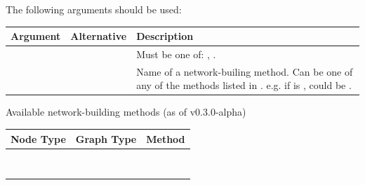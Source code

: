 \documentclass[letterpaper,10pt,english]{sphinxmanual}
\begin{document}
The following arguments should be used:

\begin{tabulary}{\linewidth}{|L|L|L|}
\hline
\textbf{
Argument
} & \textbf{
Alternative
} & \textbf{
Description
}\\\hline

 & 
 & 
Must be one of: , .
\\\hline

 & 
 & 
Name of a network-builing method. Can be
one of any of the methods listed in
{\hyperref[tethne.networks:module-tethne.networks]{}}. e.g. if  is
,  could be
.
\\\hline
\end{tabulary}


Available network-building methods (as of v0.3.0-alpha)

\begin{tabulary}{\linewidth}{|L|L|L|}
\hline
\textbf{
Node Type
} & \textbf{
Graph Type
} & \textbf{
Method
}\\\hline

 & 
 & 
{\hyperref[tethne.networks:tethne.networks.papers.author_coupling]{}}
\\\hline

 & 
 & 
{\hyperref[tethne.networks:tethne.networks.papers.bibliographic_coupling]{}}
\\\hline

 & 
 & 
{\hyperref[tethne.networks:tethne.networks.papers.cocitation]{}}
\\\hline

 & 
 & 
{\hyperref[tethne.networks:tethne.networks.papers.direct_citation]{}}
\\\hline

 & 
 & 
{\hyperref[tethne.networks:tethne.networks.authors.author_cocitation]{}}
\\\hline

 & 
 & 
{\hyperref[tethne.networks:tethne.networks.authors.author_coinstitution]{}}
\\\hline

 & 
 & 
{\hyperref[tethne.networks:tethne.networks.authors.author_papers]{}}
\\\hline

 & 
 & 
{\hyperref[tethne.networks:tethne.networks.authors.coauthors]{}}
\\\hline
\end{tabulary}
\end{document}
